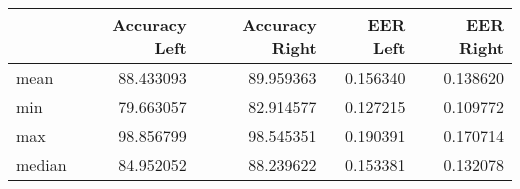 \begin{tabular}{lrrrr}
\toprule
{} &  Accuracy Left &  Accuracy Right &  EER Left &  EER Right \\
\midrule
mean   &      88.433093 &       89.959363 &  0.156340 &   0.138620 \\
min    &      79.663057 &       82.914577 &  0.127215 &   0.109772 \\
max    &      98.856799 &       98.545351 &  0.190391 &   0.170714 \\
median &      84.952052 &       88.239622 &  0.153381 &   0.132078 \\
\bottomrule
\end{tabular}
